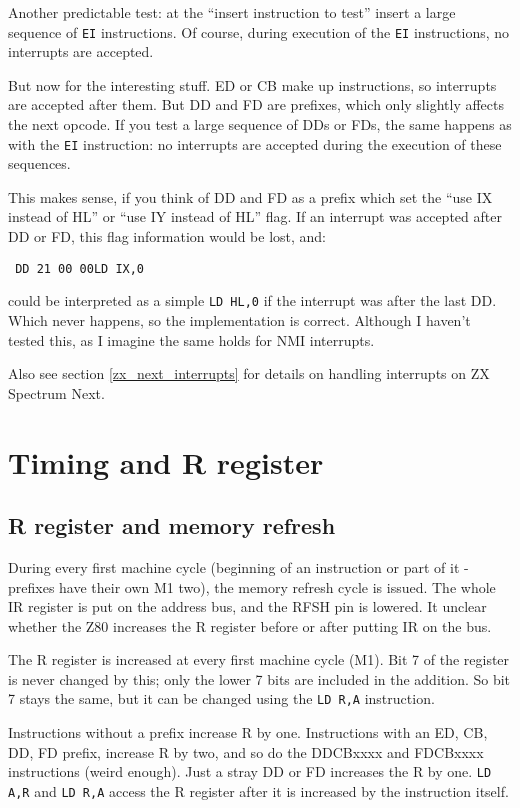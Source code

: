\documentclass[12pt,twoside,openright,a4paper]{book}
\begin{document}
Another predictable test: at the ``insert instruction to test'' insert a large sequence of {\tt EI} instructions. Of course, during execution of the {\tt EI} instructions, no interrupts are accepted. 

But now for the interesting stuff. ED or CB make up instructions, so interrupts are accepted after them. But DD and FD are prefixes, which only slightly affects the next opcode. If you test a large sequence of DDs or FDs, the same happens as with the {\tt EI} instruction: no interrupts are accepted during the execution of these sequences.

This makes sense, if you think of DD and FD as a prefix which set the ``use IX instead of HL'' or ``use IY instead of HL'' flag. If an interrupt was accepted after DD or FD, this flag information would be lost, and:

{\tt 
	{\qquad}DD 21 00 00{\qquad}LD IX,0
}

could be interpreted as a simple {\tt LD HL,0} if the interrupt was after the last DD. Which never happens, so the implementation is correct. Although I haven't tested this, as I imagine the same holds for NMI interrupts.

Also see section \ref{zx_next_interrupts} for details on handling interrupts on ZX Spectrum Next.


\pagebreak
\section{Timing and R register}

\subsection{R register and memory refresh}

During every first machine cycle (beginning of an instruction or part of it - prefixes have their own M1 two), the memory refresh cycle is issued. The whole IR register is put on the address bus, and the RFSH pin is lowered.  It unclear whether the Z80 increases the R register before or after putting IR on the bus. 

The R register is increased at every first machine cycle (M1). Bit 7 of the register is never changed by this; only the lower 7 bits are included in the addition. So bit 7 stays the same, but it can be changed using the
{\tt LD R,A} instruction.

Instructions without a prefix increase R by one. Instructions with an ED, CB, DD, FD prefix, increase R by two, and so do the DDCBxxxx and FDCBxxxx instructions (weird enough). Just a stray DD or FD increases the R by one. {\tt LD A,R} and {\tt LD R,A} access the R register after it is increased by the instruction itself. 
\end{document}
